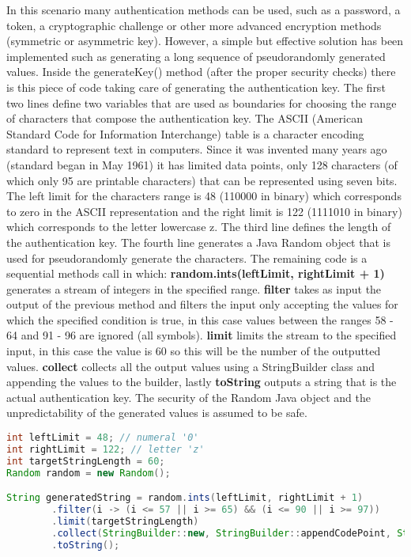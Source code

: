 In this scenario many authentication methods can be used, such as a password, a token, a cryptographic challenge or other more advanced encryption methods (symmetric or asymmetric key). However, a simple but effective solution has been implemented such as generating a long sequence of pseudorandomly generated values. Inside the generateKey() method (after the proper security checks) there is this piece of code taking care of generating the authentication key. The first two lines define two variables that are used as boundaries for choosing the range of characters that compose the authentication key. The ASCII (American Standard Code for Information Interchange) table is a character encoding standard to represent text in computers. Since it was invented many years ago (standard began in May 1961) it has limited data points, only 128 characters (of which only 95 are printable characters) that can be represented using seven bits. The left limit for the characters range is 48 (110000 in binary) which corresponds to zero in the ASCII representation and the right limit is 122 (1111010 in binary) which corresponds to the letter lowercase z. The third line defines the length of the authentication key. The fourth line generates a Java Random object that is used for pseudorandomly generate the characters. The remaining code is a sequential methods call in which: \textbf{random.ints(leftLimit, rightLimit + 1)} generates a stream of integers in the specified range. \textbf{filter} takes as input the output of the previous method and filters the input only accepting the values for which the specified condition is true, in this case values between the ranges 58 - 64 and 91 - 96 are ignored (all symbols). \textbf{limit} limits the stream to the specified input, in this case the value is 60 so this will be the number of the outputted values. \textbf{collect} collects all the output values using a StringBuilder class and appending the values to the builder, lastly \textbf{toString} outputs a string that is the actual authentication key. The security of the Random Java object and the unpredictability of the generated values is assumed to be safe.
\begin{lstlisting}[language=Java,firstnumber=82]
int leftLimit = 48; // numeral '0'
int rightLimit = 122; // letter 'z'
int targetStringLength = 60;
Random random = new Random();

String generatedString = random.ints(leftLimit, rightLimit + 1)
        .filter(i -> (i <= 57 || i >= 65) && (i <= 90 || i >= 97))
        .limit(targetStringLength)
        .collect(StringBuilder::new, StringBuilder::appendCodePoint, StringBuilder::append)
        .toString();
\end{lstlisting}

